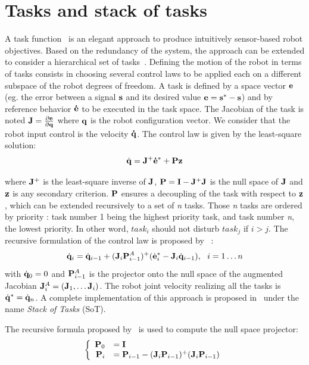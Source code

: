 \documentclass[letterpaper, 10pt, conference]{ieeeconf}      %
\begin{document}
\section{Tasks and stack of tasks}
A task function~\cite{samson91} is an elegant approach to produce intuitively
sensor-based robot objectives. Based on the redundancy of the system, the
approach can be extended to consider a hierarchical set of
tasks~\cite{siciliano91}.  Defining the motion of the robot in terms of tasks
consists in choosing several control laws to be applied each on a different
subspace of the robot degrees of freedom. A task is defined by a space vector
${\mathbf{e}}$ (eg. the error between a signal ${\mathbf{s}}$ and its desired value
${\mathbf{e}}={\mathbf{s}}^* - {\mathbf{s}}$) and by reference behavior ${\mathbf{\dot{e}}}$ to be
executed in the task space. The Jacobian of the task is noted
${\mathbf{J}}=\frac{\partial{{\mathbf{e}}}}{\partial{{\mathbf{q}}}}$ where ${\mathbf{q}}$ is the robot
configuration vector.  We consider that the robot input control is the velocity
${\mathbf{\dot{q}}}$.  The control law is given by the least-square solution:
\begin{equation}
\dot{{\mathbf{q}}} = {\mathbf{J}}^+ {\mathbf{\dot{e}}}^* + {\mathbf{P}}{\mathbf{z}}
\end{equation}

\noindent where ${\mathbf{J}}^+$ is the least-square inverse of ${\mathbf{J}}$,
${\mathbf{P}} = {\mathbf{I}} - {\mathbf{J}}^+ {\mathbf{J}}$ is the null space
of ${\mathbf{J}}$ and ${\mathbf{z}}$ is any secondary criterion. ${\mathbf{P}}$ ensures
a decoupling of the task with respect to ${\mathbf{z}}$, which can be extended
recursively to a set of \emph{n} tasks. Those \emph{n} tasks
are ordered by priority : task number 1 being the highest priority task,
and task number \emph{n}, the lowest priority.
In other word, $task_i$ should not disturb $task_j$ if $i>j$.
The recursive formulation of the control law is proposed by~\cite{siciliano91} :
\begin{equation}
\dot{{\mathbf{q}}}_i = \dot{{\mathbf{q}}}_{i-1} + ({\mathbf{J}}_i {\mathbf{P}}_{i-1}^{A})^+
(\dot{{\mathbf{e}}}^*_i - {\mathbf{J}}_i \dot{{\mathbf{q}}}_{i-1}) , \ \ i = 1 \ldots n
\end{equation}
\noindent with $\dot{{\mathbf{q}}}_0 = 0$ and ${\mathbf{P}}_{i-1}^{A}$ is
the projector onto the null space of the augmented Jacobian
${\mathbf{J}}_i^A = ({\mathbf{J}}_1, \ldots {\mathbf{J}}_i)$. The robot
joint velocity realizing all the tasks is $\dot{{\mathbf{q}}}^* = \dot{{\mathbf{q}}}_n$.
A complete implementation of this approach is proposed in~\cite{mansard07} under the
name \emph{Stack of Tasks} (SoT). 

The recursive formula proposed by~\cite{baerlocher98} is used to compute
the null space projector:
\begin{equation}
  \left\{
      \begin{array}{rl}
        {\mathbf{P}}_0 &= {\mathbf{I}}\\
        {\mathbf{P}}_i &= {\mathbf{P}}_{i-1} - ({\mathbf{J}}_i {\mathbf{P}}_{i-1})^+({\mathbf{J}}_i {\mathbf{P}}_{i-1})\\
      \end{array}
    \right.
\end{equation}
\end{document}
